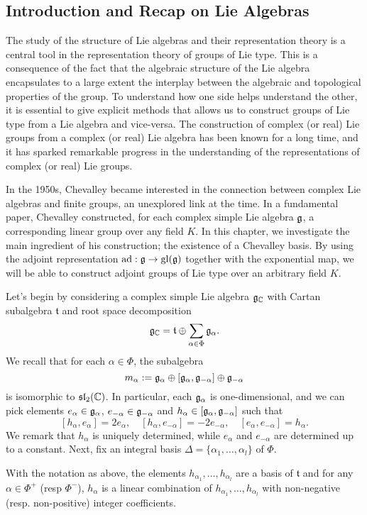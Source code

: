 \subsection{Introduction and Recap on Lie Algebras}

The study of the structure of Lie algebras and their representation theory is a central tool in the representation theory of groups of Lie type. This is a consequence of the fact that the algebraic structure of the Lie algebra encapsulates to a large extent the interplay between the algebraic and topological properties of the group. To understand how one side helps understand the other, it is essential to give explicit methods that allows us to construct groups of Lie type from a Lie algebra and vice-versa. The construction of complex (or real) Lie groups from a complex (or real) Lie algebra has been known for a long time, and it has sparked remarkable progress in the understanding of the representations of complex (or real) Lie groups. 

In the 1950s, Chevalley became interested in the connection between complex Lie algebras and finite groups, an unexplored link at the time. In a fundamental paper, Chevalley constructed, for each complex simple Lie algebra $\mathfrak{g}$, a corresponding linear group over any field $K$. In this chapter, we investigate the main ingredient of his construction; the existence of a Chevalley basis. By using the adjoint representation $\mathrm{ad}:\mathfrak{g}\to\mathrm{gl}(\mathfrak{g})$ together with the exponential map, we will be able to construct adjoint groups of Lie type over an arbitrary field $K$. 

Let's begin by considering a complex simple Lie algebra $\mathfrak{g}_{\mathbb{C}}$ with Cartan subalgebra $\mathfrak{t}$ and root space decomposition 
$$\mathfrak{g}_{\mathbb{C}}=\mathfrak{t}\oplus\sum_{\alpha\in\Phi}\mathfrak{g}_\alpha.$$
We recall that for each $\alpha\in\Phi$, the subalgebra
$$m_\alpha:=\mathfrak{g}_\alpha\oplus[\mathfrak{g}_\alpha,\mathfrak{g}_{-\alpha}]\oplus\mathfrak{g}_{-\alpha}$$
is isomorphic to $\mathfrak{sl}_2(\mathbb{C})$. In particular, each $\mathfrak{g}_\alpha$ is one-dimensional, and we can pick elements $e_\alpha\in\mathfrak{g}_\alpha$, $e_{-\alpha}\in\mathfrak{g}_{-\alpha}$ and $h_\alpha\in[\mathfrak{g}_\alpha,\mathfrak{g}_{-\alpha}]$ such that 
$$[h_\alpha,e_\alpha]=2e_\alpha,\quad[h_\alpha,e_{-\alpha}]=-2e_{-\alpha},\quad[e_\alpha,e_{-\alpha}]=h_\alpha.$$
We remark that $h_\alpha$ is uniquely determined, while $e_\alpha$ and $e_{-\alpha}$ are determined up to a constant. Next, fix an integral basis $\Delta=\{\alpha_1,\ldots,\alpha_l\}$ of $\Phi$.

\begin{lemma}
    With the notation as above, the elements $h_{\alpha_1},\ldots,h_{\alpha_l}$ are a basis of $\mathfrak{t}$ and for any $\alpha\in\Phi^+$ (resp $\Phi^-$), $h_\alpha$ is a linear combination of $h_{\alpha_1},\ldots,h_{\alpha_l}$ with non-negative (resp. non-positive) integer coefficients.
\end{lemma}

